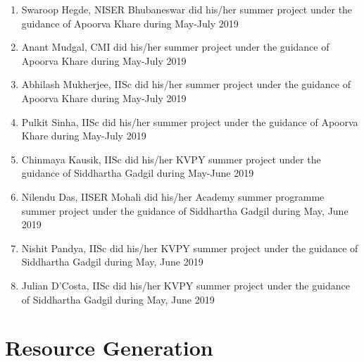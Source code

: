 \begin{enumerate}
\item Swaroop Hegde, NISER Bhubaneswar did his/her  summer project under the guidance of Apoorva Khare during May-July 2019
\item Anant Mudgal, CMI did his/her  summer project under the guidance of Apoorva Khare during May-July 2019
\item Abhilash Mukherjee, IISc did his/her  summer project under the guidance of Apoorva Khare during May-July 2019
\item Pulkit Sinha, IISc did his/her  summer project under the guidance of Apoorva Khare during May-July 2019
\item Chinmaya Kausik, IISc did his/her KVPY summer project under the guidance of Siddhartha Gadgil during May-June 2019
\item Nilendu Das, IISER Mohali did his/her Academy summer programme summer project under the guidance of Siddhartha Gadgil during May, June 2019
\item Nishit Pandya, IISc did his/her KVPY summer project under the guidance of Siddhartha Gadgil during May, June 2019
\item Julian D'Costa, IISc did his/her KVPY summer project under the guidance of Siddhartha Gadgil during May, June 2019
\end{enumerate}



\section{Resource Generation}

